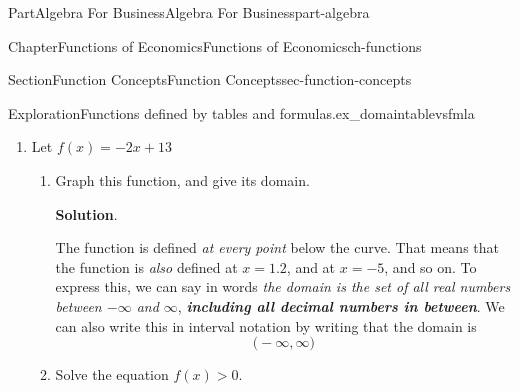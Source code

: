 \documentclass{tufte-book}
\newcommand{\blocktitlefont}{\relax}
\newcommand{\alert}[1]{\textbf{\textit{#1}}}
\numberwithin{equation}{chapter}
\begin{document}
\begin{partptx}{Part}{Algebra For Business}{}{Algebra For Business}{}{}{part-algebra}
\begin{chapterptx}{Chapter}{Functions of Economics}{}{Functions of Economics}{}{}{ch-functions}
\begin{sectionptx}{Section}{Function Concepts}{}{Function Concepts}{}{}{sec-function-concepts}
\begin{exploration}{Exploration}{Functions defined by tables and formulas.}{ex_domaintablevsfmla}
\begin{enumerate}[font=\bfseries,label=(\alph*),ref=\alph*]
\begin{enumerate}[font=\bfseries,label=(\roman*),ref=\theenumi.\roman*]
\begin{image}{0.25}{0.5}{0.25}{}
{
}%
\end{image}%
\item{}Evaluate \(f(z)\) where \(z=3\)%
\par\smallskip%
\noindent\textbf{\blocktitlefont Solution}.\hypertarget{ex_domaintablevsfmla-3-4-2}{}\quad{}\(f(3)=7\)%
\item{}Solve \(f(z)=3\)%
\par\smallskip%
\noindent\textbf{\blocktitlefont Solution}.\hypertarget{ex_domaintablevsfmla-3-5-2}{}\quad{}\(f(5) = 3\), so the solution is \(z=5\)%
\end{enumerate}%
\item{}Let \(f(x) = -2x +13\)%
\begin{enumerate}[font=\bfseries,label=(\roman*),ref=\theenumi.\roman*]%
\item{}Graph this function, and give its domain.%
\par\smallskip%
\noindent\textbf{\blocktitlefont Solution}.\hypertarget{ex_domaintablevsfmla-4-2-2}{}\quad{}%
\begin{image}{0.25}{0.5}{0.25}{}%
%
\end{image}%
The function is defined \emph{at every point} below the curve.  That means that the function is \emph{also} defined at \(x=1.2\), and at \(x=-5\), and so on. To express this, we can say in words \emph{the domain is the set of all real numbers between \(-\infty\) and \(\infty\)}, \alert{including all decimal numbers in between}. We can also write this in interval notation by writing that the domain is%
\begin{equation*}
\Big(-\infty, \infty\Big)
\end{equation*}
%
\item{}Solve the equation \(f(x)>0\).%
\par\smallskip%

\end{enumerate}
\end{enumerate}
\end{exploration}
\end{sectionptx}
\end{chapterptx}
\end{partptx}
\end{document}
